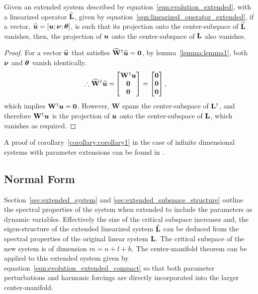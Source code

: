 \begin{corollary}
	\label{corollary:corollary1}
	Given an extended system described by equation~\eqref{eqn:evolution_extended}, with a linearized operator $\mathbf{\widehat{L}}$, given by equation~\eqref{eqn:linearized_operator_extended}, 
	if a vector, ${\widehat{\boldsymbol{u}}} = [\boldsymbol{u};\boldsymbol{\nu};\boldsymbol{\theta}]$, is such that its projection onto the center-subspace of $\mathbf{\widehat{L}}$ vanishes, then, the projection of $\boldsymbol{u}$ onto the center-subspace of $\mathbf{L}$ also vanishes.
\end{corollary}
\begin{proof}
	\label{proof:proof2}
	For a vector ${\widehat{\boldsymbol{u}}}$ that satisfies $\mathbf{\widehat{W}}^{\dagger}{\widehat{\boldsymbol{u}}} = \boldsymbol{0}$, by lemma~\ref{lemma:lemma1}, both $\boldsymbol{\nu}$ and $\boldsymbol{\theta}$ vanish identically. 
	\begin{align}
		\therefore \mathbf{\widehat{W}}^{\dagger}{\widehat{\boldsymbol{u}}} =& \begin{bmatrix}
			\mathbf{W}^{\dagger}\boldsymbol{u} \\
			\boldsymbol{0} \\
			\boldsymbol{0}
		\end{bmatrix} = \begin{bmatrix}
			\boldsymbol{0} \\
			\boldsymbol{0} \\
			\boldsymbol{0}
		\end{bmatrix}, 		\nonumber
	\end{align}
	which implies $\mathbf{W}^{\dagger}\boldsymbol{u} = \boldsymbol{0}$.  However, $\mathbf{W}$ spans the center-subspace of $\mathbf{L}^{\dagger}$, and therefore $\mathbf{W}^{\dagger}\boldsymbol{u}$ is the projection of $\boldsymbol{u}$ onto the center-subspace of $\mathbf{L}$, which vanishes as required.
\end{proof}

A proof of corollary~\ref{corollary:corollary1} in the case of infinite dimensional systems with parameter extensions can be found in \cite{haragus11}. 

\subsection{Normal Form}
\label{sec:normal_form}


Section~\ref{sec:extended_system} and \ref{sec:extended_subspace_structure} outline the spectral properties of the system when extended to include the parameters as dynamic variables. Effectively the size of the critical subspace increases and, the eigen-structure of the extended linearized system $\mathbf{\widehat{L}}$ can be deduced from the spectral properties of the original linear system $\mathbf{L}$. The critical subspace of the new system is of dimension $m=n+l+h$. The center-manifold theorem can be applied to this extended system given by equation~\eqref{eqn:evolution_extended_compact} so that both parameter perturbations and harmonic forcings are directly incorporated into the larger center-manifold. 

